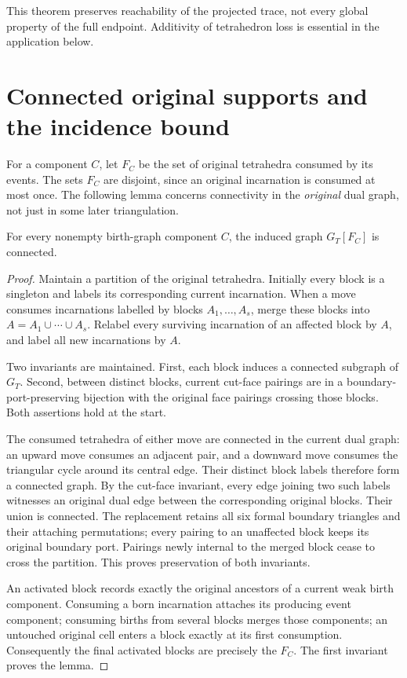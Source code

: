 This theorem preserves reachability of the projected trace, not every global
property of the full endpoint. Additivity of tetrahedron loss is essential
in the application below.

\section{Connected original supports and the incidence bound}

For a component $C$, let $F_C$ be the set of original tetrahedra consumed by
its events. The sets $F_C$ are disjoint, since an original incarnation is
consumed at most once. The following lemma concerns connectivity in the
\emph{original} dual graph, not just in some later triangulation.

\begin{lemma}\label{lem:connected}
For every nonempty birth-graph component $C$, the induced graph
$G_T[F_C]$ is connected.
\end{lemma}
\begin{proof}
Maintain a partition of the original tetrahedra. Initially every block is
a singleton and labels its corresponding current incarnation. When a move
consumes incarnations labelled by blocks $A_1,\ldots,A_s$, merge these
blocks into $A=A_1\cup\cdots\cup A_s$. Relabel every surviving incarnation
of an affected block by $A$, and label all new incarnations by $A$.

Two invariants are maintained. First, each block induces a connected
subgraph of $G_T$. Second, between distinct blocks, current cut-face pairings
are in a boundary-port-preserving bijection with the original face pairings
crossing those blocks. Both assertions hold at the start.

The consumed tetrahedra of either move are connected in the current dual
graph: an upward move consumes an adjacent pair, and a downward move
consumes the triangular cycle around its central edge. Their distinct block
labels therefore form a connected graph. By the cut-face invariant, every
edge joining two such labels witnesses an original dual edge between the
corresponding original blocks. Their union is connected. The replacement
retains all six formal boundary triangles and their attaching permutations;
every pairing to an unaffected block keeps its original boundary port.
Pairings newly internal to the merged block cease to cross the partition.
This proves preservation of both invariants.

An activated block records exactly the original ancestors of a current weak
birth component. Consuming a born incarnation attaches its producing event
component; consuming births from several blocks merges those components;
an untouched original cell enters a block exactly at its first consumption.
Consequently the final activated blocks are precisely the $F_C$. The first
invariant proves the lemma.
\end{proof}

